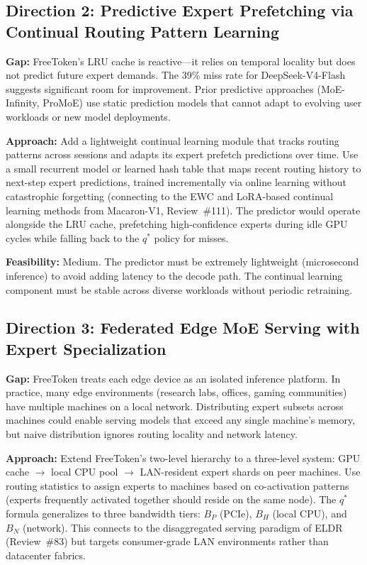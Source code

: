 \documentclass[11pt,a4paper]{article}
\begin{document}
\subsection{Direction 2: Predictive Expert Prefetching via Continual Routing Pattern Learning}
\textbf{Gap:} FreeToken's LRU cache is reactive---it relies on temporal locality but does not predict future expert demands. The 39\% miss rate for DeepSeek-V4-Flash suggests significant room for improvement. Prior predictive approaches (MoE-Infinity, ProMoE) use static prediction models that cannot adapt to evolving user workloads or new model deployments.

\textbf{Approach:} Add a lightweight continual learning module that tracks routing patterns across sessions and adapts its expert prefetch predictions over time. Use a small recurrent model or learned hash table that maps recent routing history to next-step expert predictions, trained incrementally via online learning without catastrophic forgetting (connecting to the EWC and LoRA-based continual learning methods from Macaron-V1, Review~\#111). The predictor would operate alongside the LRU cache, prefetching high-confidence experts during idle GPU cycles while falling back to the $q^*$ policy for misses.

\textbf{Feasibility:} Medium. The predictor must be extremely lightweight (microsecond inference) to avoid adding latency to the decode path. The continual learning component must be stable across diverse workloads without periodic retraining.

\subsection{Direction 3: Federated Edge MoE Serving with Expert Specialization}
\textbf{Gap:} FreeToken treats each edge device as an isolated inference platform. In practice, many edge environments (research labs, offices, gaming communities) have multiple machines on a local network. Distributing expert subsets across machines could enable serving models that exceed any single machine's memory, but naive distribution ignores routing locality and network latency.

\textbf{Approach:} Extend FreeToken's two-level hierarchy to a three-level system: GPU cache $\to$ local CPU pool $\to$ LAN-resident expert shards on peer machines. Use routing statistics to assign experts to machines based on co-activation patterns (experts frequently activated together should reside on the same node). The $q^*$ formula generalizes to three bandwidth tiers: $B_P$ (PCIe), $B_H$ (local CPU), and $B_N$ (network). This connects to the disaggregated serving paradigm of ELDR (Review~\#83) but targets consumer-grade LAN environments rather than datacenter fabrics.
\end{document}
